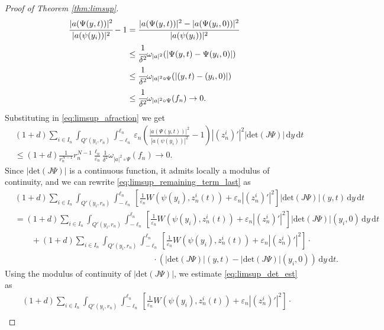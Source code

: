 \documentclass[a4paper, 11pt, reqno]{amsart}
\theoremstyle{plain}
\theoremstyle{definition}
\theoremstyle{remark}
\newcommand{\dd}{\,\mathrm{d}}
\begin{document}
\begin{proof}[Proof of Theorem \ref{thm:limsup}]
\begin{align*}
    \cfrac{|a(\Psi(y,t))|^2}{|a(\psi(y_i))|^2} - 1 &= \cfrac{| a(\Psi(y,t))|^2 - |a(\Psi(y_i,0))|^2}{|a(\psi(y_i))|^2} \\
    &\leq \cfrac{1}{\delta^2} \omega_{|a|^2} (|\Psi(y,t) - \Psi(y_i,0)|) \\
    &\leq \cfrac{1}{\delta^2} \omega_{|a|^2 \circ \Psi} (|(y,t) - (y_i,0)|) \\
    &\leq \cfrac{1}{\delta^2} \omega_{|a|^2 \circ \Psi} (f_n) \to 0.
\end{align*}
Substituting in \eqref{eq:limsup_afraction} we get
\begin{align*}
    &(1+d) \sum_{i \in I_n} \int_{Q'(y_i,r_n)} \int_{-\ell_n}^{\ell_n} \varepsilon_n \left( \frac{|a(\Psi(y,t))|^2}{|a(\psi(y_i))|^2} - 1 \right) | (z_n^i)' |^2 | \mathrm{det} (J\Psi)| \dd y \dd t \\
    &\leq (1+d) \frac{1}{r_n^{N-1}} r_n^{N-1} \frac{\ell_n}{\varepsilon_n} \frac{1}{\delta^2} \omega_{|a|^2 \circ \Psi} (f_n) \to 0.
\end{align*}
Since $| \mathrm{det} (J\Psi)|$ is a continuous function, it admits locally a modulus of continuity, and we can rewrite \eqref{eq:limsup_remaining_term_last} as
\begin{align}
    &(1+d) \sum_{i \in I_n} \int_{Q'(y_i,r_n)} \int_{-\ell_n}^{\ell_n} \left[ \frac{1}{\varepsilon_n} W(\psi(y_i), z_n^i(t)) + \varepsilon_n | (z_n^i)'|^2 \right] | \mathrm{det} (J\Psi)|(y,t) \dd y \dd t \nonumber \\
    &= (1+d) \sum_{i \in I_n} \int_{Q'(y_i,r_n)} \int_{-\ell_n}^{\ell_n} \left[ \frac{1}{\varepsilon_n} W(\psi(y_i), z_n^i(t)) + \varepsilon_n | (z_n^i)'|^2 \right] | \mathrm{det} (J\Psi)|(y_i,0) \dd y \dd t \label{eq:limsup_det_est_other} \\
    &\qquad+ (1+d) \sum_{i \in I_n} \int_{Q'(y_i,r_n)} \int_{-\ell_n}^{\ell_n} \left[ \frac{1}{\varepsilon_n} W(\psi(y_i), z_n^i(t)) + \varepsilon_n | (z_n^i)' |^2 \right] \cdot \nonumber \\
    &\hspace{7cm} \cdot\left( | \mathrm{det} (J\Psi)|(y,t) - | \mathrm{det} (J\Psi)|(y_i,0) \right) \dd y \dd t \label{eq:limsup_det_est}.
\end{align}
Using the modulus of continuity of $|\mathrm{det}(J \Psi)|$, we estimate \eqref{eq:limsup_det_est} as
\begin{align*}
    &(1+d) \sum_{i \in I_n} \int_{Q'(y_i,r_n)} \int_{-\ell_n}^{\ell_n} \left[ \frac{1}{\varepsilon_n} W(\psi(y_i), z_n^i(t)) + \varepsilon_n | (z_n^i)' |^2 \right]\cdot\\

\end{align*}
\end{proof}
\end{document}
